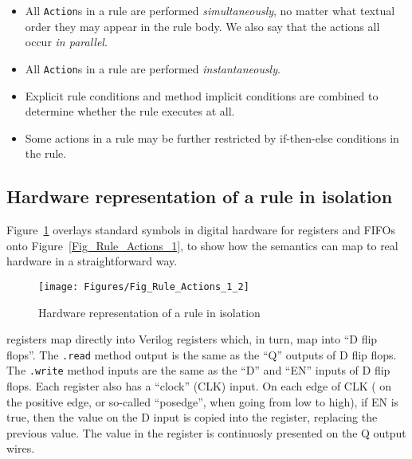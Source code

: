 \begin{itemize}

 \item All \verb|Action|s in a rule are performed
       \emph{simultaneously}, no matter what textual order they may
       appear in the rule body.  We also say that the actions all
       occur \emph{in parallel}.

 \item All \verb|Action|s in a rule are performed
       \emph{instantaneously}.

 \item Explicit rule conditions and method implicit conditions are
       combined to determine whether the rule executes at all.

 \item Some actions in a rule may be further restricted by
       if-then-else conditions in the rule.

\end{itemize}




\subsection{Hardware representation of a rule in isolation}

\label{Sec_HW_representation_of_a_rule}

Figure~\ref{Fig_Rule_Actions_1_2} overlays standard symbols in digital
hardware for registers and FIFOs onto Figure~\ref{Fig_Rule_Actions_1},
to show how the semantics can map to real hardware in a
straightforward way.
\begin{figure}[htbp]
  \centerline{\texttt{[image: Figures/Fig\_Rule\_Actions\_1\_2]}}
  \caption{\label{Fig_Rule_Actions_1_2} Hardware representation of a rule in isolation}
\end{figure}

{\BSV} registers map directly into Verilog registers which, in turn, map
into ``D flip flops''.  The \verb|.read| method output is the same as
the ``Q'' outputs of D flip flops.  The \verb|.write| method inputs
are the same as the ``D'' and ``EN'' inputs of D flip flops.  Each
register also has a ``clock'' (CLK) input.  On each edge of CLK ({\eg}
on the positive edge, or so-called ``posedge'', when going from low to
high), if EN is true, then the value on the D input is copied into the
register, replacing the previous value.  The value in the register is
continuosly presented on the Q output wires.

